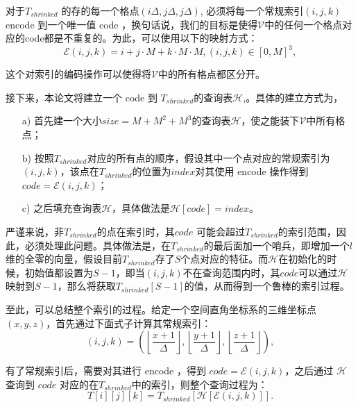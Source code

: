 对于$ T_{shrinked}$ 的存的每一个格点$\left(i\Delta, j\Delta, j\Delta\right)$, 必须将每一个常规索引$\left(i, j, k\right)$ encode 到一个唯一值 code ，换句话说，我们的目标是使得$\mathcal{V}$中的任何一个格点对应的code都是不重复的。为此，可以使用以下的映射方式：
\begin{equation}
    \mathcal{E}\left(i, j, k\right) = i + j\cdot M + k\cdot M \cdot M, \left(i, j, k\right) \in \left[0, M\right]^3,
\end{equation}

这个对索引的编码操作可以使得将$\mathcal{V}$中的所有格点都区分开。

接下来，本论文将建立一个 code 到 $T_{shrinked}$的查询表$\mathcal{H}$,。具体的建立方式为，
\begin{enumerate}
    \item[a)] 首先建一个大小$size = M + M^2 + M^3$的查询表$\mathcal{H}$，使之能装下$\mathcal{V}$中所有格点；
    \item[b)] 按照$T_{shrinked}$对应的所有点的顺序，假设其中一个点对应的常规索引为$\left(i, j, k\right)$，该点在$T_{shrinked}$的位置为$index$对其使用 encode 操作得到$code = \mathcal{E}\left(i, j, k\right)$；
    \item[c)] 之后填充查询表$\mathcal{H}$，具体做法是$\mathcal{H}[code] = index$。
\end{enumerate}
严谨来说，非$T_{shrinked}$的点在索引时，其$code$ 可能会超过$T_{shrinked}$的索引范围，因此，必须处理此问题。具体做法是，在$T_{shrinked}$的最后面加一个哨兵，即增加一个$l$维的全零的向量，假设目前$T_{shrinked}$存了$S$个点对应的特征。而$\mathcal{H}$在初始化的时候，初始值都设置为$S-1$，即当$\left(i, j, k\right)$不在查询范围内时，其$code$可以通过$\mathcal{H}$映射到$S-1$，那么将获取$T_{shrinked}\left[S-1\right]$的值，从而得到一个鲁棒的索引过程。

至此，可以总结整个索引的过程。给定一个空间直角坐标系的三维坐标点$\left(x, y, z\right)$，首先通过下面式子计算其常规索引：
\begin{equation}
    \left(i, j, k\right) = \left(\left \lfloor \frac{x + 1}{\Delta} \right \rfloor, \left \lfloor \frac{y + 1}{\Delta} \right \rfloor, \left \lfloor \frac{z + 1}{\Delta} \right \rfloor\right),
\end{equation}

有了常规索引后，需要对其进行 encode ，得到 $code = \mathcal{E}\left(i, j, k\right)$，之后通过 $\mathcal{H}$ 查询到 $code$ 对应的在$T_{shrinked}$中的索引，则整个查询过程为：
\begin{equation}
    T\left[i \right]\left[j \right]\left[k \right] = T_{shrinked} \left[\mathcal{H}\left[\mathcal{E}\left(i, j, k\right) \right] \right].
\end{equation}

